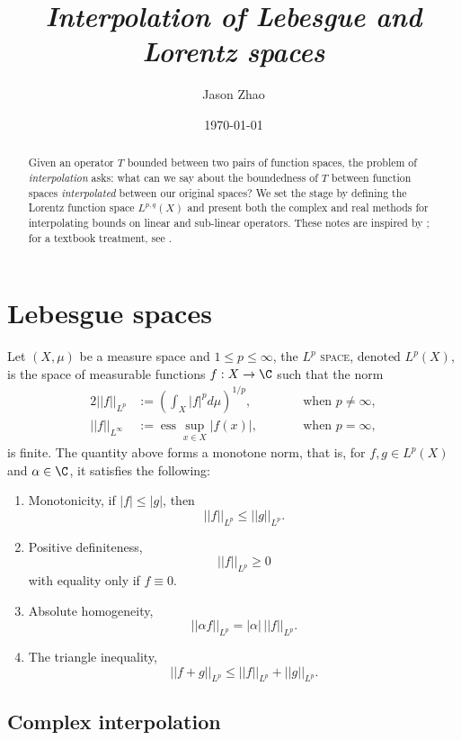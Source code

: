 \documentclass[reqno]{amsart}
\title
{
	\emph{Interpolation of Lebesgue and Lorentz spaces}
}
\author{Jason Zhao}
\date{\today}
\theoremstyle{definition}
\theoremstyle{remark}
\renewcommand{\emph}{\textsc}
\begin{document}
\maketitle

\begin{abstract}
	Given an operator $T$ bounded between two pairs of function spaces, the problem of \textit{interpolation} asks: what can we say about the boundedness of $T$ between function spaces \textit{interpolated} between our original spaces? We set the stage by defining the Lorentz function space $L^{p, q} (X)$ and present both the complex and real methods for interpolating bounds on linear and sub-linear operators. These notes are inspired by \cite{Tao2006}; for a textbook treatment, see \cite{Grafakos2014}. 
\end{abstract}

\tableofcontents

\section{Lebesgue spaces}

Let $(X, \mu)$ be a measure space and $1\leq p \leq \infty$, the \emph{$L^p$ space}, denoted $L^p (X)$, is the space of measurable functions $f: X \to \C$ such that the norm
	\begin{alignat*}{2}
		||f||_{L^p} 
			&:= \left( \int_X |f|^p d \mu \right)^{1/p}, 
			&&\qquad \text{when $p \neq \infty$}, \\
		||	f||_{L^\infty}
			&:= \operatorname{ess} \sup_{x \in X} |f(x)|,
			&&\qquad \text{when $p = \infty$,}
	\end{alignat*}
is finite. The quantity above forms a monotone norm, that is, for $f, g \in L^p (X)$ and $\alpha \in \C$, it satisfies the following:
\begin{enumerate}
	\item Monotonicity, if $|f| \leq |g|$, then 
		\[ ||f||_{L^p} \leq ||g||_{L^p}. \]
	\item Positive definiteness, 
		\[||f||_{L^p} \geq 0 \]
	with equality only if $f \equiv 0$. 	
	\item Absolute homogeneity, 
		\[ ||\alpha f||_{L^p} = |\alpha| \, ||f||_{L^p}. \]
	\item The triangle inequality, 
		\[ ||f + g||_{L^p} \leq ||f||_{L^p} + ||g||_{L^p}. \]
\end{enumerate}



\subsection{Complex interpolation}
\end{document}
